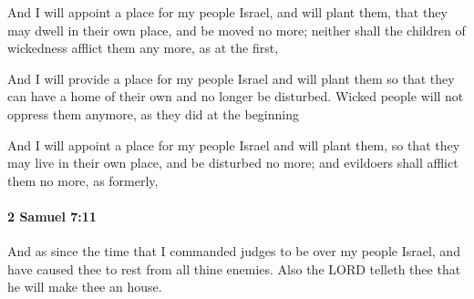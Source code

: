 			\begin{versebox}
					\item[BHS] 
					\item[ASV] And I will appoint a place for my people Israel, and will plant them, that they may dwell in their own place, and be moved no more; neither shall the children of wickedness afflict them any more, as at the first,
					\item[NIV] And I will provide a place for my people Israel and will plant them so that they can have a home of their own and no longer be disturbed. Wicked people will not oppress them anymore, as they did at the beginning
					\item[NRSV] And I will appoint a place for my people Israel and will plant them, so that they may live in their own place, and be disturbed no more; and evildoers shall afflict them no more, as formerly,
			\end{versebox}

		\paragraph{2 Samuel 7:11} %
			\label{2SAMUEL-7-11}

			And as since the time that I commanded judges to be over my people Israel, and have caused thee to rest from all thine enemies. Also the LORD telleth thee that he will make thee an house.

